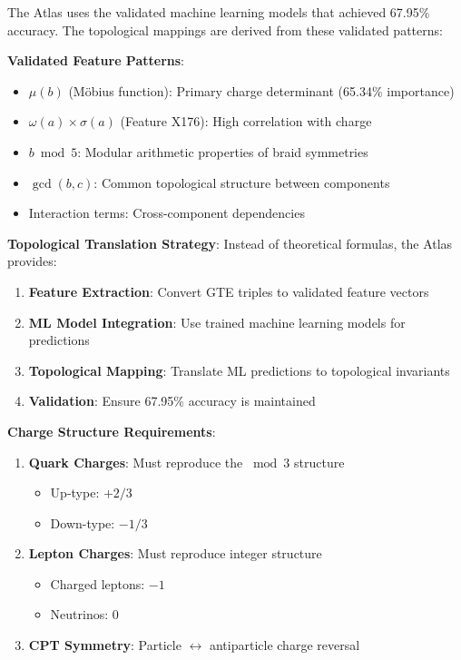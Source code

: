 \documentclass[11pt]{article}
\theoremstyle{remark}
\begin{document}
The Atlas uses the validated machine learning models that achieved 67.95\% accuracy. The topological mappings are derived from these validated patterns:

\textbf{Validated Feature Patterns}:
\begin{itemize}
    \item $\mu(b)$ (Möbius function): Primary charge determinant (65.34\% importance)
    \item $\omega(a) \times \sigma(a)$ (Feature X176): High correlation with charge
    \item $b \bmod 5$: Modular arithmetic properties of braid symmetries
    \item $\gcd(b,c)$: Common topological structure between components
    \item Interaction terms: Cross-component dependencies
\end{itemize}

\textbf{Topological Translation Strategy}:
Instead of theoretical formulas, the Atlas provides:
\begin{enumerate}
    \item \textbf{Feature Extraction}: Convert GTE triples to validated feature vectors
    \item \textbf{ML Model Integration}: Use trained machine learning models for predictions
    \item \textbf{Topological Mapping}: Translate ML predictions to topological invariants
    \item \textbf{Validation}: Ensure 67.95\% accuracy is maintained
\end{enumerate}

\textbf{Charge Structure Requirements}:
\begin{enumerate}
    \item \textbf{Quark Charges}: Must reproduce the $\bmod 3$ structure
    \begin{itemize}
        \item Up-type: $+2/3$
        \item Down-type: $-1/3$
    \end{itemize}
    \item \textbf{Lepton Charges}: Must reproduce integer structure
    \begin{itemize}
        \item Charged leptons: $-1$
        \item Neutrinos: $0$
    \end{itemize}
    \item \textbf{CPT Symmetry}: Particle $\leftrightarrow$ antiparticle charge reversal
\end{enumerate}
\end{document}
